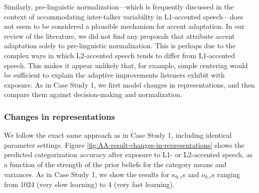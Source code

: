 \documentclass[
  11pt,
  english,
  man,floatsintext]{apa6}
\begin{document}
Similarly, pre-linguistic normalization---which is frequently discussed in the context of accommodating inter-talker variability in L1-accented speech---does not seem to be considered a plausible mechanism for accent adaptation. In our review of the literature, we did not find any proposals that attribute accent adaptation solely to pre-linguistic normalization. This is perhaps due to the complex ways in which L2-accented speech tends to differ from L1-accented speech. This makes it appear unlikely that, for example, simple centering would be sufficient to explain the adaptive improvements listeners exhibit with exposure. As in Case Study 1, we first model changes in representations, and then compare them against decision-making and normalization.

\hypertarget{changes-in-representations-1}{%
\subsubsection{Changes in representations}\label{changes-in-representations-1}}

We follow the exact same approach as in Case Study 1, including identical parameter settings.
Figure \ref{fig:AA-result-changes-in-representations} shows the predicted categorization accuracy after exposure to L1- or L2-accented speech, as a function of the strength of the prior beliefs for the category means and variances. As in Case Study 1, we show the results for \(\kappa_{0,c}\)s and \(\nu_{0,c}\)s ranging from 1024 (very slow learning) to 4 (very fast learning).
\end{document}
